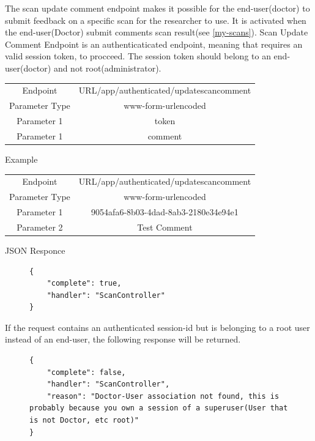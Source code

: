 					The scan update comment endpoint makes it possible for the end-user(doctor) to submit feedback on a specific scan for the researcher to use. 
					It is activated when the end-user(Doctor) submit comments scan result(see \ref{my-scans}). Scan Update Comment Endpoint is an authenticaticated endpoint, 
					meaning that requires an valid session token, to procceed.  The session token should belong to an end-user(doctor) and not root(administrator).
					\begin{center}
						\begin{tabular}{ |c|c| } 
							\hline
							Endpoint & {{URL}}/app/authenticated/updatescancomment\\
							Parameter Type & www-form-urlencoded  \\
							Parameter 1 & token  \\
							Parameter 1 & comment  \\
							\hline
						\end{tabular}
					\end{center}
					Example
					\begin{center}
						\begin{tabular}{ |c|c| } 
							\hline
							Endpoint & {{URL}}/app/authenticated/updatescancomment\\
							Parameter Type & www-form-urlencoded  \\
							Parameter 1 & 9054afa6-8b03-4dad-8ab3-2180e34e94e1  \\
							Parameter 2 & Test Comment  \\
							\hline
						\end{tabular}
					\end{center}
					JSON Responce
					\begin{figure}[H]
						\iftrue
						\begin{lstlisting}[]
{
	"complete": true,
	"handler": "ScanController"
}
						\end{lstlisting}
					\end{figure}
					If the request contains an authenticated session-id but is belonging to a root user instead of an end-user, the following response will be returned.
					\begin{figure}[H]
						\iftrue
						\begin{lstlisting}[]
{	
	"complete": false,
	"handler": "ScanController",
	"reason": "Doctor-User association not found, this is probably because you own a session of a superuser(User that is not Doctor, etc root)"
}
						\end{lstlisting}
					\end{figure}

